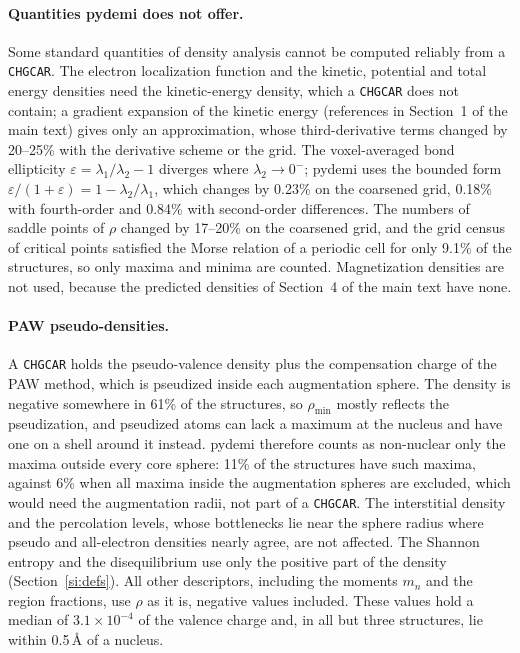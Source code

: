 \documentclass[journal=jctcce,manuscript=suppinfo,email=true]{achemso}
\newcommand{\rev}[1]{{\color{blue}#1}}
\begin{document}
\paragraph{Quantities pydemi does not offer.} Some standard quantities of
density analysis cannot be computed reliably from a \texttt{CHGCAR}. The
electron localization function and the kinetic, potential and total energy
densities need the kinetic-energy density, which a \texttt{CHGCAR} does not
contain; a gradient expansion of the kinetic energy (references in Section~1
of the main text) gives only an approximation, whose third-derivative terms
changed by 20--25\% with the derivative scheme or the grid. The voxel-averaged
bond ellipticity $\varepsilon=\lambda_1/\lambda_2-1$ diverges where
$\lambda_2\to0^-$\rev{;} pydemi uses the bounded form
$\varepsilon/(1+\varepsilon)=1-\lambda_2/\lambda_1$, which changes by \rev{0.23\%} on
the coarsened grid, 0.18\% with fourth-order and \rev{0.84\%} with second-order
differences. The numbers of saddle points of $\rho$ changed by 17--20\% on the
coarsened grid, and the grid census of critical points satisfied the Morse
relation of a periodic cell for only 9.1\% of the structures, so only maxima and
minima are counted. Magnetization densities are not used, because the predicted
densities of Section~4 of the main text have none.

\paragraph{PAW pseudo-densities.} A \texttt{CHGCAR} holds the pseudo-valence
density plus the compensation charge of the PAW method, which is pseudized
inside each augmentation sphere. The density is negative somewhere in 61\% of
the structures, so $\rho_{\min}$ mostly reflects the pseudization, and pseudized
atoms can lack a maximum at the nucleus \rev{and have one on a shell around it
instead. pydemi therefore counts as non-nuclear only the maxima outside every
core sphere: 11\% of the structures have such maxima, against 6\% when all
maxima inside the augmentation spheres are excluded, which would need the
augmentation radii, not part of a \texttt{CHGCAR}}. The interstitial density and the percolation levels, whose bottlenecks
lie near the sphere radius where pseudo and all-electron densities nearly
agree, are not affected. \rev{The Shannon entropy and the disequilibrium use only
the positive part of the density (Section~\ref{si:defs}). All other descriptors, including
the moments $m_n$ and the region fractions, use $\rho$ as it is, negative values included.
These values hold a median of $3.1\times10^{-4}$ of the valence charge and, in all but three
structures, lie within 0.5\,\AA{} of a nucleus.}
\end{document}
